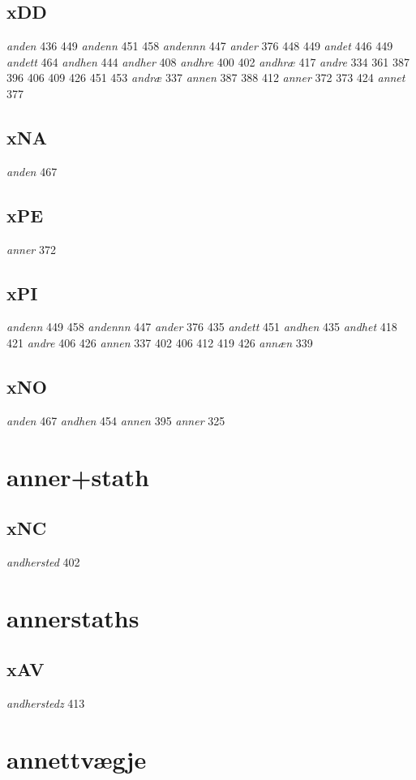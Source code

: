 \documentclass[a4paper,twocolumn]{article}
\begin{document}
\subsection{xDD}
\label{sec:org3a3cec1}
\emph{anden} 436 449 \emph{andenn} 451 458 \emph{andennn} 447 \emph{ander} 376 448 449 \emph{andet} 446 449 \emph{andett} 464 \emph{andhen} 444 \emph{andher} 408 \emph{andhre} 400 402 \emph{andhræ} 417 \emph{andre} 334 361 387 396 406 409 426 451 453 \emph{andræ} 337 \emph{annen} 387 388 412 \emph{anner} 372 373 424 \emph{annet} 377 
\subsection{xNA}
\label{sec:org8d4bc23}
\emph{anden} 467 
\subsection{xPE}
\label{sec:org5ac799b}
\emph{anner} 372 
\subsection{xPI}
\label{sec:org6466d1e}
\emph{andenn} 449 458 \emph{andennn} 447 \emph{ander} 376 435 \emph{andett} 451 \emph{andhen} 435 \emph{andhet} 418 421 \emph{andre} 406 426 \emph{annen} 337 402 406 412 419 426 \emph{annæn} 339 
\subsection{xNO}
\label{sec:org6d8615b}
\emph{anden} 467 \emph{andhen} 454 \emph{annen} 395 \emph{anner} 325 
\section{anner+stath}
\label{sec:org9358b1d}
\subsection{xNC}
\label{sec:orgb38a5a8}
\emph{andhersted} 402 
\section{annerstaths}
\label{sec:org033d1d4}
\subsection{xAV}
\label{sec:orgca09fb5}
\emph{andherstedz} 413 
\section{annettvægje}
\label{sec:org091ed08}
\end{document}
